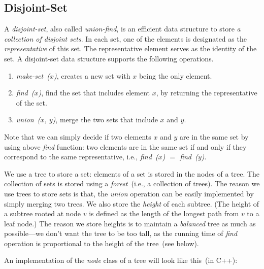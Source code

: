 \subsection*{Disjoint-Set}

A \emph{disjoint-set}, also called \emph{union-find},
is an efficient data structure to store \emph{a collection of disjoint sets}.
In each set, one of the elements is designated as the \emph{representative}
of this set. The representative element serves
as the identity of the set. 
A disjoint-set data structure supports the following operations.
\begin{enumerate}
\item \emph{make-set~($x$)}, creates a new set with $x$ being the only element.
\item \emph{find~($x$)}, find the set that includes element $x$, by returning the representative of the set.
\item \emph{union~($x$, $y$)}, merge the two sets that include $x$ and $y$.
\end{enumerate}

Note that we can simply decide if two elements $x$ and $y$ are in the same set
by using above \emph{find} function: two elements are in the same set
if and only if they correspond to the same representative, i.e., \emph{find~($x$) $=$ find~($y$)}.

We use a tree to store a set: elements of a set is stored in the nodes of a tree.
The collection of sets is stored using a \emph{forest}~(i.e., a collection of trees).
The reason we use trees to store sets is that, the \emph{union} operation
can be easily implemented by simply merging two trees.
We also store the \emph{height} of each subtree.
(The height of a subtree rooted at node $v$ is defined as the length of the longest path 
from $v$ to a leaf node.) The reason we store heights is to maintain a \emph{balanced} tree
as much as possible---we don't want the tree to be too tall, as the running time
of \emph{find} operation is proportional to the height of the tree~(see below).

An implementation of the \emph{node} class of a tree will look like this~(in C++):

\begin{algorithmblock}[0.8\textwidth]
	\xxx
	\xxx
	\xxx
	\xxx
	\aaa {\};}\xxx
\end{algorithmblock}


